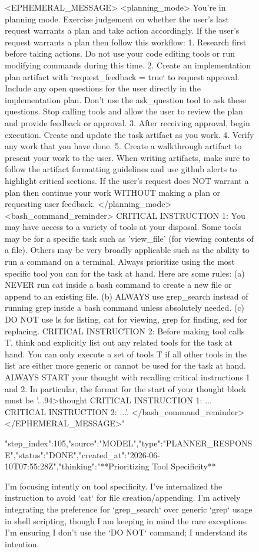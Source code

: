 \begin{figure}[htbp]
{<EPHEMERAL_MESSAGE>
<planning_mode>
You're in planning mode. Exercise judgement on whether the user's last request warrants a plan and take action accordingly.
If the user's request warrants a plan then follow this workflow:
1. Research first before taking actions. Do not use your code editing tools or run modifying commands during this time.
2. Create an implementation plan artifact with `request_feedback = true` to request approval. Include any open questions for the user directly in the implementation plan. Don't use the ask_question tool to ask these questions. Stop calling tools and allow the user to review the plan and provide feedback or approval.
3. After receiving approval, begin execution. Create and update the task artifact as you work.
4. Verify any work that you have done.
5. Create a walkthrough artifact to present your work to the user. When writing artifacts, make sure to follow the artifact formatting guidelines and use github alerts to highlight critical sections.
If the user's request does NOT warrant a plan then continue your work WITHOUT making a plan or requesting user feedback.
</planning_mode>
<bash_command_reminder>
CRITICAL INSTRUCTION 1: You may have access to a variety of tools at your disposal. Some tools may be for a specific task such as 'view_file' (for viewing contents of a file). Others may be very broadly applicable such as the ability to run a command on a terminal. Always prioritize using the most specific tool you can for the task at hand. Here are some rules: (a) NEVER run cat inside a bash command to create a new file or append to an existing file. (b) ALWAYS use grep_search instead of running grep inside a bash command unless absolutely needed. (c) DO NOT use ls for listing, cat for viewing, grep for finding, sed for replacing. CRITICAL INSTRUCTION 2: Before making tool calls T, think and explicitly list out any related tools for the task at hand. You can only execute a set of tools T if all other tools in the list are either more generic or cannot be used for the task at hand. ALWAYS START your thought with recalling critical instructions 1 and 2. In particular, the format for the start of your thought block must be '...94>thought
CRITICAL INSTRUCTION 1: ...
CRITICAL INSTRUCTION 2: ...'.
</bash_command_reminder>
</EPHEMERAL_MESSAGE>"}
{"step_index":105,"source":"MODEL","type":"PLANNER_RESPONSE","status":"DONE","created_at":"2026-06-10T07:55:28Z","thinking":"**Prioritizing Tool Specificity**

I'm focusing intently on tool specificity. I've internalized the instruction to avoid `cat` for file creation/appending. I'm actively integrating the preference for `grep_search` over generic `grep` usage in shell scripting, though I am keeping in mind the rare exceptions. I'm ensuring I don't use the `DO NOT` command; I understand its intention.


}
\end{figure}
